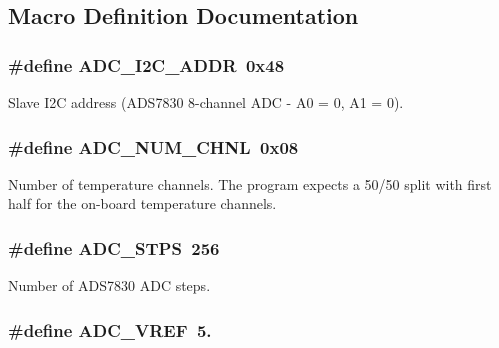 \subsection{Macro Definition Documentation}
\hypertarget{a00042_a5fd3aabe18504a5314a5d0e71e3bc495}{
\subsubsection[{A\-D\-C\-\_\-\-I2\-C\-\_\-\-A\-D\-D\-R}]{\setlength{\rightskip}{0pt plus 5cm}\#define A\-D\-C\-\_\-\-I2\-C\-\_\-\-A\-D\-D\-R~0x48}}\label{a00042_a5fd3aabe18504a5314a5d0e71e3bc495}
Slave I2\-C address (A\-D\-S7830 8-\/channel A\-D\-C -\/ A0 = 0, A1 = 0). \hypertarget{a00042_a448e8a52be570dfe9fdddb2045039534}{
\subsubsection[{A\-D\-C\-\_\-\-N\-U\-M\-\_\-\-C\-H\-N\-L}]{\setlength{\rightskip}{0pt plus 5cm}\#define A\-D\-C\-\_\-\-N\-U\-M\-\_\-\-C\-H\-N\-L~0x08}}\label{a00042_a448e8a52be570dfe9fdddb2045039534}
Number of temperature channels. The program expects a 50/50 split with first half for the on-\/board temperature channels. \hypertarget{a00042_a9be6401f8c9339711816bec5ca55dd88}{
\subsubsection[{A\-D\-C\-\_\-\-S\-T\-P\-S}]{\setlength{\rightskip}{0pt plus 5cm}\#define A\-D\-C\-\_\-\-S\-T\-P\-S~256}}\label{a00042_a9be6401f8c9339711816bec5ca55dd88}
Number of A\-D\-S7830 A\-D\-C steps. \hypertarget{a00042_a5a03d0b939a8dda552c9fe3319a82485}{
\subsubsection[{A\-D\-C\-\_\-\-V\-R\-E\-F}]{\setlength{\rightskip}{0pt plus 5cm}\#define A\-D\-C\-\_\-\-V\-R\-E\-F~5.}}\label{a00042_a5a03d0b939a8dda552c9fe3319a82485}
